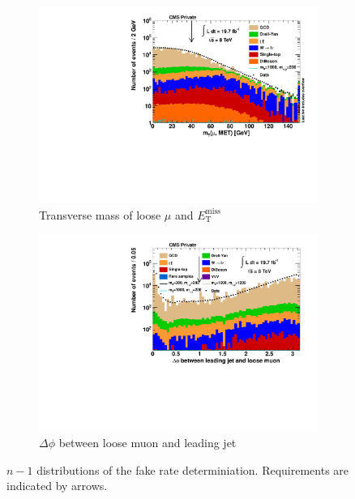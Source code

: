\begin{figure}[!ht]
  \ContinuedFloat
  \centering
  \begin{subfigure}[b]{0.495\textwidth}
    \centering
    \includegraphics[width=\textwidth]{plots/nTL_mt.pdf}
    \caption{Transverse mass of loose $\mu$ and $E_{\text{T}}^{\text{miss}}$ \label{fig:ntlmt}}
  \end{subfigure}
  \begin{subfigure}[b]{0.495\textwidth}
    \centering
    \includegraphics[width=\textwidth]{plots/nTL_jetdphi.pdf}
    \caption{$\Delta \phi$ between loose muon and leading jet \label{fig:ntljetdphi}}
  \end{subfigure}

  \caption{$n - 1$ distributions of the fake rate determiniation. Requirements are indicated by arrows.}
  \label{fig:ntl}
\end{figure}

